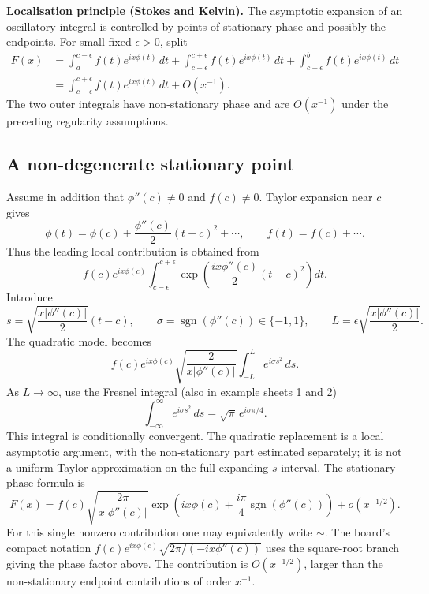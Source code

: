 \documentclass[11pt,a4paper]{article}
\begin{document}
\medskip
\noindent\textbf{Localisation principle (Stokes and Kelvin).}
The asymptotic expansion of an oscillatory integral is controlled by
points of stationary phase and possibly the endpoints.
For small fixed $\epsilon>0$, split
\begin{align*}
    F(x)&=\int_a^{c-\epsilon}f(t)e^{ix\phi(t)}\,dt
    +\int_{c-\epsilon}^{c+\epsilon}f(t)e^{ix\phi(t)}\,dt
    +\int_{c+\epsilon}^b f(t)e^{ix\phi(t)}\,dt\\
    &=\int_{c-\epsilon}^{c+\epsilon}f(t)e^{ix\phi(t)}\,dt+O(x^{-1}).
\end{align*}
The two outer integrals have non-stationary phase and are $O(x^{-1})$
under the preceding regularity assumptions.

\subsection*{A non-degenerate stationary point}
Assume in addition that $\phi''(c)\neq0$ and $f(c)\neq0$.
Taylor expansion near $c$ gives
\[
    \phi(t)=\phi(c)+\frac{\phi''(c)}2(t-c)^2+\cdots,
    \qquad f(t)=f(c)+\cdots.
\]
Thus the leading local contribution is obtained from
\[
    f(c)e^{ix\phi(c)}\int_{c-\epsilon}^{c+\epsilon}
    \exp\!\left(\frac{ix\phi''(c)}2(t-c)^2\right)dt.
\]
Introduce
\[
    s=\sqrt{\frac{x|\phi''(c)|}{2}}(t-c),\qquad
    \sigma=\operatorname{sgn}(\phi''(c))\in\{-1,1\},\qquad
    L=\epsilon\sqrt{\frac{x|\phi''(c)|}{2}}.
\]
The quadratic model becomes
\[
    f(c)e^{ix\phi(c)}\sqrt{\frac{2}{x|\phi''(c)|}}
    \int_{-L}^{L}e^{i\sigma s^2}\,ds.
\]
As $L\to\infty$, use the Fresnel integral (also in example sheets 1 and 2)
\[
    \int_{-\infty}^{\infty}e^{i\sigma s^2}\,ds
    =\sqrt{\pi}\,e^{i\sigma\pi/4}.
\]
This integral is conditionally convergent. The quadratic replacement is
a local asymptotic argument, with the non-stationary part estimated
separately; it is not a uniform Taylor approximation on the full
expanding $s$-interval. The stationary-phase formula is
\[
    \boxed{F(x)=f(c)\sqrt{\frac{2\pi}{x|\phi''(c)|}}
    \exp\!\left(ix\phi(c)+\frac{i\pi}{4}
    \operatorname{sgn}(\phi''(c))\right)+o(x^{-1/2}).}
\]
For this single nonzero contribution one may equivalently write $\sim$.
The board's compact notation
$f(c)e^{ix\phi(c)}\sqrt{2\pi/(-ix\phi''(c))}$ uses the square-root
branch giving the phase factor above. The contribution is $O(x^{-1/2})$,
larger than the non-stationary endpoint contributions of order $x^{-1}$.
\end{document}
